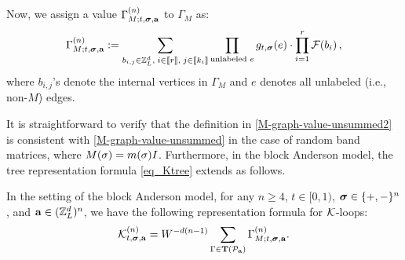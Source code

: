 \begin{definition}
\begin{enumerate}
    
      
  \end{enumerate}
Now, we assign a value $\Gamma^{(n)}_{M;t,\bsig,\ba}$ to $\Gamma_M$ as:
\begin{equation}\label{M-graph-value-unsummed2}
\Gamma^{(n)}_{M;t,\bsig,\ba} := \sum_{b_{i,j} \in \Zn,\; i\in\qqq{r},\; j\in\qqq{k_i}}  \prod_{\text{unlabeled }e} g_{t,\bsig}(e) \cdot \prod_{i=1}^r \cal F(b_i) \,  ,
\end{equation}
where $b_{i,j}$'s denote the internal vertices in $\Gamma_M$ and $e$ denotes all unlabeled (i.e., non-$M$) edges.  
\end{definition}

It is straightforward to verify that the definition in \eqref{M-graph-value-unsummed2} is consistent with \eqref{M-graph-value-unsummed} in the case of random band matrices, where $M(\sig) = m(\sig) I$. Furthermore, in the block Anderson model, the tree representation formula \eqref{eq_Ktree} extends as follows.
 

\begin{lemma}\label{tree-representation_BA}
In the setting of the block Anderson model, for any $n\ge 4$, $t\in[0,1)$, $\bsig\in \{+,-\}^n$, and $\ba\in (\Zn)^n$, we have the following representation formula for $\cal K$-loops:
\begin{equation}\label{eq:tree_rep2}
\cK_{t,\bsig,\ba}^{(n)}
=W^{-d(n-1)} \sum_{\Gamma \in \TSP\p{\mathcal{P}_{\ba}}} \Gamma^{(n)}_{M;t,\bsig,\ba}.
  \end{equation}
\end{lemma}

 

